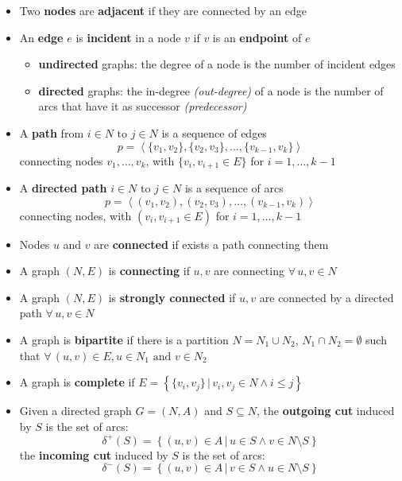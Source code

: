 \documentclass[english]{article}
\begin{document}
\begin{itemize}
  \item Two \textbf{nodes} are \textbf{adjacent} if they are connected by an edge
  \item An \textbf{edge} \(e\) is \textbf{incident} in a node \(v\) if \(v\) is an \textbf{endpoint} of \(e\)
        \begin{itemize}
          \item \textbf{undirected} graphs: the degree of a node is the number of incident edges
          \item \textbf{directed} graphs: the in-degree \textit{(out-degree)} of a node is the number of arcs that have it as successor \textit{(predecessor)}
        \end{itemize}
  \item A \textbf{path} from \(i \in N \text{ to } j \in N\) is a sequence of edges
        \[ p = \left\langle \{v_1, v_2\}, \{v_2, v_3\}, \ldots, \{v_{k-1}, v_k\}\right\rangle \]
        connecting nodes \(v_1, \ldots, v_k\), with \(\{v_i, v_{i+1} \in E\}\) for \(i = 1, \ldots, k-1\)
  \item A \textbf{directed path} \(i \in N \text{ to } j \in N\) is a sequence of arcs
        \[ p = \left\langle (v_1, v_2), (v_2, v_3), \ldots, (v_{k-1}, v_k)\right\rangle \]
        connecting nodes, with  \((v_i, v_{i+1} \in E)\)  for \(i = 1, \ldots, k-1\)
  \item Nodes \(u\) and \(v\) are \textbf{connected} if exists a path connecting them
  \item A graph \((N, E)\) is \textbf{connecting} if \(u, v\) are connecting \(\forall \, u, v \in N\)
  \item A graph \((N, E)\) is \textbf{strongly connected} if \(u, v\) are connected by a directed path \(\forall \, u, v \in N\)
  \item A graph is \textbf{bipartite} if there is a partition \(N = N_1 \cup N_2, \, N_1 \cap N_2 = \emptyset\) such that \(\forall \, (u, v) \in E, u \in N_1 \text{ and } v \in N_2\)
  \item A graph is \textbf{complete} if \(E = \left\{\{v_i, v_j\} \,|\, v_i, v_j \in N \land i \leq j \right\}\)
  \item Given a directed graph \(G = (N, A)\) and \(S \subseteq N\), the \textbf{outgoing cut} induced by \(S\) is the set of arcs:
        \[\delta^+(S) = \left\{ (u, v) \in A \,|\, u \in S \land v \in N \setminus S \right\}\]
        the \textbf{incoming cut} induced by \(S\) is the set of arcs:
        \[\delta^-(S) = \left\{ (u, v) \in A \,|\, v \in S \land u \in N \setminus S \right\}\]
\end{itemize}
\end{document}
